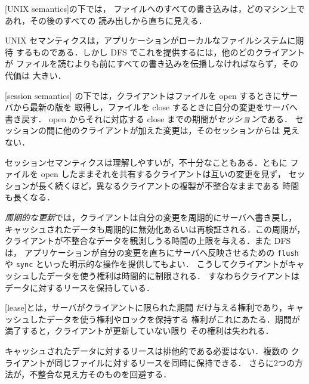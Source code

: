 \documentclass[../main.tex]{subfiles}
\begin{document}
\begin{definition}
  [UNIX semantics]の下では，
  ファイルへのすべての書き込みは，どのマシン上であれ，その後のすべての
  読み出しから直ちに見える．
\end{definition}

UNIX セマンティクスは，アプリケーションがローカルなファイルシステムに期待
するものである．しかし DFS でこれを提供するには，他のどのクライアントが
ファイルを読むよりも前にすべての書き込みを伝播しなければならず，その代価は
大きい．

\begin{definition}[セッションセマンティクス]
  [session semantics]%
  の下では，クライアントはファイルを open するときにサーバから最新の版を
  取得し，ファイルを close するときに自分の変更をサーバへ書き戻す．
  open からそれに対応する close までの期間が\emph{セッション}である．
  セッションの間に他のクライアントが加えた変更は，そのセッションからは
  見えない．
\end{definition}

セッションセマンティクスは理解しやすいが，不十分なこともある．ともに
ファイルを open したままそれを共有するクライアントは互いの変更を見ず，
セッションが長く続くほど，異なるクライアントの複製が不整合なままである
時間も長くなる．

\emph{周期的な更新}では，クライアントは自分の変更を周期的にサーバへ書き戻し，
キャッシュされたデータも周期的に無効化あるいは再検証される．この周期が，
クライアントが不整合なデータを観測しうる時間の上限を与える．また DFS は，
アプリケーションが自分の変更を直ちにサーバへ反映させるための
\texttt{flush} や \texttt{sync} といった明示的な操作を提供してもよい．
こうしてクライアントがキャッシュしたデータを使う権利は時間的に制限される．
すなわちクライアントはデータに対するリースを保持している．

\begin{definition}[リース]
  [lease]とは，サーバがクライアントに限られた期間
  だけ与える権利であり，キャッシュしたデータを使う権利やロックを保持する
  権利がこれにあたる．期間が満了すると，クライアントが更新していない限り
  その権利は失われる．
\end{definition}

キャッシュされたデータに対するリースは排他的である必要はない．複数の
クライアントが同じファイルに対するリースを同時に保持できる．
さらに2つの方法が，不整合な見え方そのものを回避する．
\end{document}
